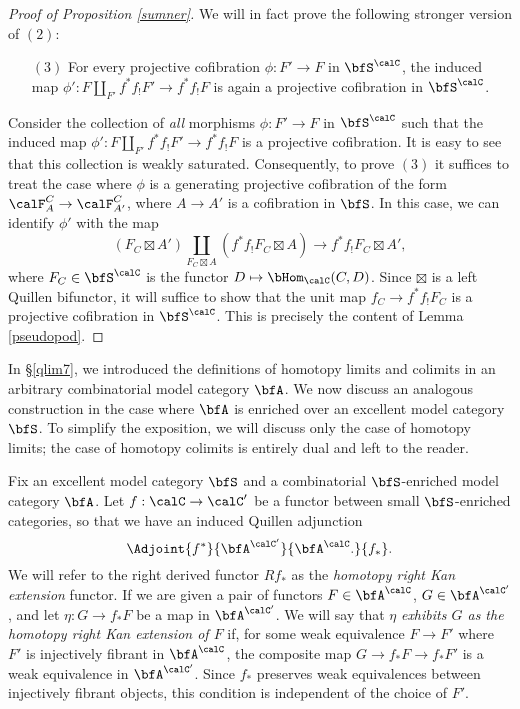 \begin{proof}[Proof of Proposition \ref{sumner}]
We will in fact prove the following stronger version of $(2)$:
\begin{itemize}
\item[$(3)$] For every projective cofibration $\phi: F' \rightarrow F$ in $\bfS^{\calC}$, the induced map
$\phi': F \coprod_{F'} f^{\ast} f_{!} F' \rightarrow f^{\ast} f_{!} F$ is again a projective cofibration in 
$\bfS^{\calC}$. 
\end{itemize}
Consider the collection of {\em all} morphisms $\phi: F' \rightarrow F$ in $\bfS^{\calC}$ such that
the induced map $\phi': F \coprod_{F'} f^{\ast} f_{!} F' \rightarrow f^{\ast} f_{!} F$ is
a projective cofibration. It is easy to see that this collection is weakly saturated. Consequently, to prove
$(3)$ it suffices to treat the case where $\phi$ is a generating projective cofibration of the form
$\calF^{C}_{A} \rightarrow \calF^{C}_{A'}$, where $A \rightarrow A'$ is a cofibration in $\bfS$. 
In this case, we can identify $\phi'$ with the map 
$$ (F_C \boxtimes A') \coprod_{ F_C \boxtimes A } (f^{\ast} f_{!} F_C \boxtimes A) \rightarrow f^{\ast} f_{!} F_C \boxtimes A',$$
where $F_C \in \bfS^{\calC}$ is the functor $D \mapsto \bHom_{\calC}(C, D)$. Since
$\boxtimes$ is a left Quillen bifunctor, it will suffice to show that the unit map
$f_C \rightarrow f^{\ast} f_{!} F_C$ is a projective cofibration in $\bfS^{\calC}$. This is precisely the content of Lemma \ref{pseudopod}.
\end{proof}

In \S \ref{qlim7}, we introduced the definitions of homotopy limits and colimits in an arbitrary
combinatorial model category $\bfA$. We now discuss an analogous construction in the case where $\bfA$ is enriched over an excellent model category $\bfS$. To simplify the exposition, we will discuss only the case of homotopy limits; the case of homotopy colimits is entirely dual and left to the reader.

Fix an excellent model category $\bfS$ and a combinatorial $\bfS$-enriched model category $\bfA$. Let $f: \calC \rightarrow \calC'$ be a functor between small $\bfS$-enriched categories,
so that we have an induced Quillen adjunction
$$ \Adjoint{f^{\ast}}{\bfA^{\calC'}}{\bfA^{\calC}.}{f_{\ast}}.$$
We will refer to the right derived functor $Rf_{\ast}$ as the {\it homotopy right Kan extension} functor. If we are given a pair of functors $F \in \bfA^{\calC}$, $G \in \bfA^{\calC'}$, and let $\eta: G \rightarrow f_{\ast} F$ be a map in $\bfA^{\calC'}$. We will say that $\eta$ {\it exhibits $G$ as the homotopy right Kan extension of $F$}
if, for some weak equivalence $F \rightarrow F'$ where $F'$ is injectively fibrant in $\bfA^{\calC}$, the
composite map $G \rightarrow f_{\ast} F \rightarrow f_{\ast} F'$ is a weak equivalence in
$\bfA^{\calC'}$. Since $f_{\ast}$ preserves weak equivalences between injectively fibrant objects, this condition is independent of the choice of $F'$.

